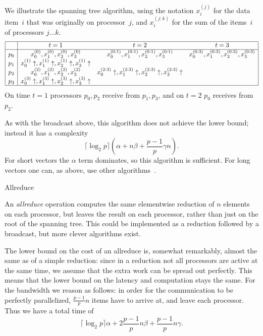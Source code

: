 We illustrate the spanning tree algorithm,
using the notation $x_i^{(j)}$ for the data item~$i$
that was originally on processor~$j$, and $x_i^{(j:k)}$ for the sum of
the items~$i$ of processors $j\ldots k$.
\[
\begin{array}{|c|ccc|}
\hline
  &t=1&t=2&t=3\\ \hline
p_0&x_0^{(0)},x_1^{(0)},x_2^{(0)},x_3^{(0)}
   &x_0^{(0:1)},x_1^{(0:1)},x_2^{(0:1)},x_3^{(0:1)}
   &x_0^{(0:3)},x_1^{(0:3)},x_2^{(0:3)},x_3^{(0:3)}\\
p_1&x_0^{(1)}\uparrow,x_1^{(1)}\uparrow,x_2^{(1)}\uparrow,x_3^{(1)}\uparrow
   &&\\
p_2&x_0^{(2)},x_1^{(2)},x_2^{(2)},x_3^{(2)}
   &x_0^{(2:3)}\uparrow,x_1^{(2:3)}\uparrow,x_2^{(2:3)}\uparrow,x_3^{(2:3)}\uparrow
   &\\
p_3&x_0^{(3)}\uparrow,x_1^{(3)}\uparrow,x_2^{(3)}\uparrow,x_3^{(3)}\uparrow
   &&\\
\hline
\end{array}
\]
On time $t=1$ processors $p_0,p_2$ receive from $p_1,p_3$, and on
$t=2$ $p_0$ receives from~$p_2$.

As with the broadcast above, 
this algorithm does not achieve the lower bound; instead it has a complexity
\[ \lceil\log_2 p\rceil (\alpha+n\beta +\frac{p-1}p \gamma n). \]
For short vectors the $\alpha$ term dominates, so this algorithm is sufficient.
For long vectors one can, as above, use other algorithms~\cite{Chan2007Collective}.


 {Allreduce}

An \emph{allreduce} operation computes the same elementwise reduction of $n$
elements on each processor, but leaves the result on each processor,
rather than just on the root of the spanning tree. This could be
implemented as a reduction followed by a broadcast, but more clever
algorithms exist.

The lower bound on the cost of an allreduce is, somewhat remarkably,
almost the same as of a simple reduction: since in a reduction not all
processors are active at the same time, we assume that the extra work
can be spread out perfectly. This means that the lower bound on the
latency and computation stays the same. For the bandwidth we reason as
follows: in order for the communication to be perfectly parallelized,
$\frac{p-1}p n$ items have to arrive at, and leave each
processor. Thus we have a total time of
\[ \lceil \log_2 p\rceil\alpha +2\frac{p-1}pn\beta
    +\frac{p-1}pn\gamma. \]

